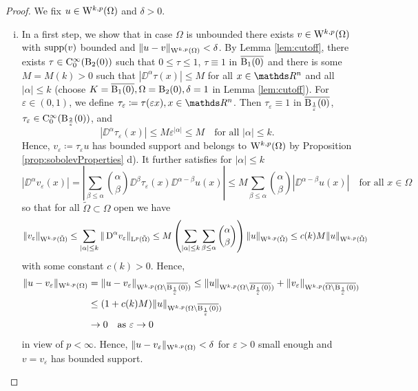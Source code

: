 \begin{proof}
  We fix $u \in \mathrm{W}^{k,p}(\Omega)$ and $\delta > 0$.
  \begin{enumerate}[i)]
    \item In a first step, we show that in case $\Omega$ is unbounded there exists $v \in \mathrm{W}^{k,p}(\Omega)$ with $\operatorname{supp}(v)$ bounded and $\|u - v\|_{\mathrm{W}^{k,p}(\Omega)} < \delta$.
      By Lemma \ref{lem:cutoff}, there exists $\tau \in \mathrm{C}_0^\infty(\mathrm{B}_2(0))$ such that $0 \leq \tau \leq 1$, $\tau \equiv 1$ in $\overline{\mathrm{B}_1(0)}$ and there is some $M = M(k) > 0$ such that $|\DD^\alpha \tau(x)| \leq M$ for all $x \in \R^n$ and all $|\alpha| \leq k$ (choose $K = \overline{\mathrm{B}_1(0)}, \Omega= \mathrm{B}_2(0), \delta = 1$ in Lemma \ref{lem:cutoff}).
      For $\varepsilon \in (0,1)$, we define $\tau_\varepsilon \coloneqq \tau(\varepsilon x), x \in \R^n$.
      Then $\tau_\varepsilon \equiv 1$ in $\overline{\mathrm{B}_{\frac{1}{\varepsilon}}(0)}$, $\tau_\varepsilon \in \mathrm{C}_0^\infty(\mathrm{B}_{\frac{2}{\varepsilon}}(0))$, and
      \begin{equation}
        |\DD^\alpha \tau_\varepsilon(x)| \leq M \varepsilon^{|\alpha|} \leq M \quad\text{for all } |\alpha| \leq k.
      \end{equation}
      Hence, $v_\varepsilon \coloneqq \tau_\varepsilon u$ has bounded support and belongs to $\mathrm{W}^{k,p}(\Omega)$ by Proposition \ref{prop:sobolevProperties} d).
      It further satisfies for $|\alpha| \leq k$
      $$
      |\DD^\alpha v_\varepsilon(x)| 
      = | \sum_{\beta \leq \alpha} \binom{\alpha}{\beta} \DD^\beta \tau_\varepsilon(x) \DD^{\alpha - \beta} u(x)|
      \leq M \sum_{\beta \leq \alpha} \binom{\alpha}{\beta} | \DD^{\alpha - \beta} u(x)| \quad\text{for all } x \in\Omega
      $$
      so that for all $\tilde\Omega \subset \Omega$ open we have
      $$
        \|v_\varepsilon\|_{\mathrm{W}^{k,p}(\tilde\Omega)}
        \leq \sum_{|\alpha|\leq k} \|\,{\operatorname{D}}^\alpha v_\varepsilon\|_{\mathrm{L}^p(\tilde\Omega)}
        \leq M \left( \sum_{|\alpha| \leq k} \sum_{\beta\leq\alpha} \binom{\alpha}{\beta} \right) \|u\|_{\mathrm{W}^{k,p}(\tilde\Omega)}
        \leq c(k) M \|u\|_{\mathrm{W}^{k,p}(\tilde\Omega)}
      $$
      with some constant $c(k) > 0$.
      Hence,
      \begin{align*}
        \|u - v_\varepsilon\|_{\mathrm{W}^{k,p}(\Omega)}
        &= \|u - v_\varepsilon\|_{\mathrm{W}^{k,p}(\Omega \setminus \overline{\mathrm{B}_{\frac{1}{\varepsilon}}(0)})}
        \leq \|u\|_{\mathrm{W}^{k,p}(\Omega \setminus \overline{B_{\frac{1}{\varepsilon}}(0)})} + \|v_\varepsilon\|_{\mathrm{W}^{k,p}(\overline{\Omega \setminus \mathrm{B}_{\frac{1}{\varepsilon}}(0)})} \\
        &\leq (1 + c(k)M) \|u\|_{\mathrm{W}^{k,p}(\Omega \setminus \overline{\mathrm{B}_{\frac{1}{\varepsilon}}(0)})} \\
        &\to 0 \quad\text{as } \varepsilon \to 0
      \end{align*}
      in view of $p < \infty$.
      Hence, $\|u - v_\varepsilon\|_{\mathrm{W}^{k,p}(\Omega)} < \delta$ for $\varepsilon > 0$ small enough and $v = v_\varepsilon$ has bounded support.


\end{enumerate}
\end{proof}

